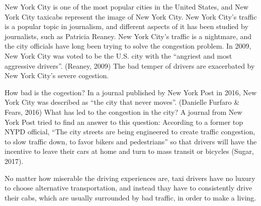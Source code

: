 \documentclass[12pt,twoside]{reedthesis}
\theoremstyle{definition}
\theoremstyle{definition}
\theoremstyle{definition}
\theoremstyle{remark}
\begin{document}
New York City is one of the most popular cities in the United States,
and New York City taxicabs represent the image of New York City. New
York City's traffic is a popular topic in journalism, and different
aspects of it has been studied by journalists, such as Patricia Reaney.
New York City's traffic is a nightmare, and the city officials have long
been trying to solve the congestion problem. In 2009, New York City was
voted to be the U.S. city with the ``angriest and most aggressive
drivers''. (Reaney, 2009) The bad temper of drivers are exacerbated by
New York City's severe cogestion.

How bad is the cogestion? In a journal published by New York Post in
2016, New York City was described as ``the city that never moves''.
(Danielle Furfaro \& Fears, 2016) What has led to the congestion in the
city? A journal from New York Post tried to find an answer to this
question: According to a former top NYPD official, ``The city streets
are being engineered to create traffic congestion, to slow traffic down,
to favor bikers and pedestrians'' so that drivers will have the
incentive to leave their cars at home and turn to mass transit or
bicycles (Sugar, 2017).

No matter how miserable the driving experiences are, taxi drivers have
no luxury to choose alternative transportation, and instead thay have to
consistently drive their cabs, which are usually surrounded by bad
traffic, in order to make a living.
\end{document}
